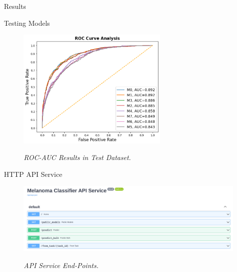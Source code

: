 \documentclass[dvipsnames,mathserif]{beamer}
\begin{document}
{    \begin{frame}
      \begin{center}
        \Huge Results
      \end{center}
    \end{frame}

    \begin{frame}
      \large Testing Models
      \vspace{0.25cm}
      \begin{figure}[H]
        \centering
        \includegraphics[width=0.65\textwidth]{images/rocaucanalysis-all.png}
        \caption[ROC-AUC Results in Test Dataset]{\textit{ROC-AUC Results in Test Dataset. }}
        {\label{fig:rocaucanalysis-all}}
      \end{figure}

    \end{frame}

    \begin{frame}

      \large HTTP API Service
      \vspace{0.25cm}

      \begin{figure}[H]
        \centering
        \begin{adjustbox}{width=0.9\textwidth, trim={0cm 0cm 0.1cm 0cm}, clip}
          \includegraphics[width=\textwidth]{images/api-endpoints.png}
        \end{adjustbox}
        \caption[API Service End-Points]{\textit{API Service End-Points. }}
        {\label{fig:api-endpoints}}
      \end{figure}
    \end{frame}



}
\end{document}
